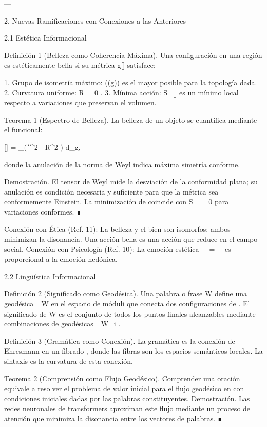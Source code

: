 \documentclass[12pt,twoside]{book}
\begin{document}
---

2. Nuevas Ramificaciones con Conexiones a las Anteriores

2.1 Estética Informacional

Definición 1 (Belleza como Coherencia Máxima). Una configuración  \rho  en una región  \Omega  es estéticamente bella si su métrica  g[\rho]  satisface:

1. Grupo de isometría máximo:  \dim((g))  es el mayor posible para la topología dada.
2. Curvatura uniforme:  \nabla R = 0 .
3. Mínima acción:  S_{}[\rho]  es un mínimo local respecto a variaciones que preservan el volumen.

Teorema 1 (Espectro de Belleza). La belleza de un objeto se cuantifica mediante el funcional:

[\rho] =  \int_\Omega \left( \|  \|^2 -  R^2 \right) d_g,

donde la anulación de la norma de Weyl indica máxima simetría conforme.

Demostración. El tensor de Weyl mide la desviación de la conformidad plana; su anulación es condición necesaria y suficiente para que la métrica sea conformemente Einstein. La minimización de    coincide con  \delta S_{} = 0  para variaciones conformes. ∎

Conexión con Ética (Ref. 11): La belleza y el bien son isomorfos: ambos minimizan la disonancia. Una acción bella es una acción que reduce    en el campo social.
Conexión con Psicología (Ref. 10): La emoción estética  _{} = \nabla_{}   es proporcional a la emoción hedónica.

2.2 Lingüística Informacional

Definición 2 (Significado como Geodésica). Una palabra o frase  W  define una geodésica  \gamma_W  en el espacio de móduli    que conecta dos configuraciones de  \rho . El significado de  W  es el conjunto de todos los puntos finales alcanzables mediante combinaciones de geodésicas  \gamma_{W_i} .

Definición 3 (Gramática como Conexión). La gramática es la conexión de Ehresmann en un fibrado   \to {} , donde las fibras son los espacios semánticos locales. La sintaxis es la curvatura de esta conexión.

Teorema 2 (Comprensión como Flujo Geodésico). Comprender una oración equivale a resolver el problema de valor inicial para el flujo geodésico en    con condiciones iniciales dadas por las palabras constituyentes.
Demostración. Las redes neuronales de transformers aproximan este flujo mediante un proceso de atención que minimiza la disonancia entre los vectores de palabras. ∎
\end{document}
